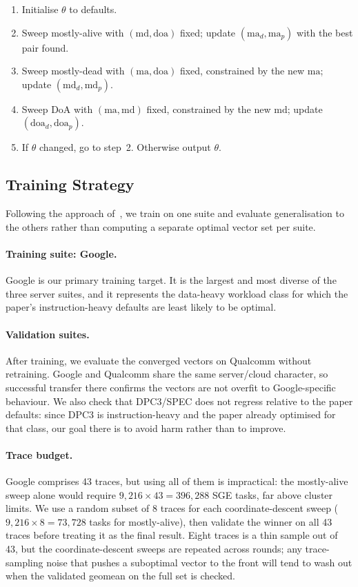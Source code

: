 \documentclass[12pt]{article}
\begin{document}
\begin{enumerate}
  \item Initialise $\theta$ to defaults.
  \item Sweep mostly-alive with $(\text{md}, \text{doa})$ fixed; update
        $(\text{ma}_d, \text{ma}_p)$ with the best pair found.
  \item Sweep mostly-dead with $(\text{ma}, \text{doa})$ fixed, constrained by
        the new $\text{ma}$; update $(\text{md}_d, \text{md}_p)$.
  \item Sweep DoA with $(\text{ma}, \text{md})$ fixed, constrained by the new
        $\text{md}$; update $(\text{doa}_d, \text{doa}_p)$.
  \item If $\theta$ changed, go to step~2.  Otherwise output $\theta$.
\end{enumerate}

\subsection{Training Strategy}
\label{sec:pacipv_training_strategy}

Following the approach of~\cite{mostofi2025pacipv}, we train on one suite
and evaluate generalisation to the others rather than computing a separate
optimal vector set per suite.

\paragraph{Training suite: Google.}  Google is our primary training target.
It is the largest and most diverse of the three server suites, and it
represents the data-heavy workload class for which the paper's instruction-heavy
defaults are least likely to be optimal.

\paragraph{Validation suites.}  After training, we evaluate the converged
vectors on Qualcomm without retraining.  Google and Qualcomm share the same
server/cloud character, so successful transfer there confirms the vectors are
not overfit to Google-specific behaviour.  We also check that DPC3/SPEC does
not regress relative to the paper defaults: since DPC3 is instruction-heavy and
the paper already optimised for that class, our goal there is to avoid harm
rather than to improve.

\paragraph{Trace budget.}  Google comprises 43 traces, but using all of them
is impractical: the mostly-alive sweep alone would require
$9{,}216 \times 43 = 396{,}288$ SGE tasks, far above cluster limits.
We use a random subset of 8 traces for each coordinate-descent sweep
($9{,}216 \times 8 = 73{,}728$ tasks for mostly-alive), then validate the
winner on all 43 traces before treating it as the final result.
Eight traces is a thin sample out of 43, but the coordinate-descent sweeps
are repeated across rounds; any trace-sampling noise that pushes a suboptimal
vector to the front will tend to wash out when the validated geomean on the
full set is checked.
\end{document}
